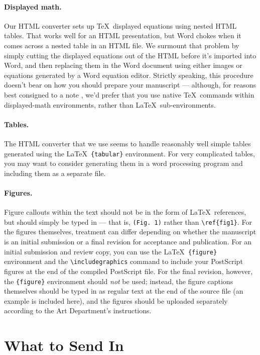\documentclass[12pt]{article}
\begin{document}
\paragraph*{Displayed math.} Our HTML converter sets up \TeX\
displayed equations using nested HTML tables.  That works well for an
HTML presentation, but Word chokes when it comes across a nested
table in an HTML file.  We surmount that problem by simply cutting the
displayed equations out of the HTML before it's imported into Word,
and then replacing them in the Word document using either images or
equations generated by a Word equation editor.  Strictly speaking,
this procedure doesn't bear on how you should prepare your manuscript
--- although, for reasons best consigned to a note \cite{nattex}, we'd
prefer that you use native \TeX\ commands within displayed-math
environments, rather than \LaTeX\ sub-environments.

\paragraph*{Tables.}  The HTML converter that we use seems to handle
reasonably well simple tables generated using the \LaTeX\
\texttt{\{tabular\}} environment.  For very complicated tables, you
may want to consider generating them in a word processing program and
including them as a separate file.

\paragraph*{Figures.}  Figure callouts within the text should not be
in the form of \LaTeX\ references, but should simply be typed in ---
that is, \verb+(Fig. 1)+ rather than \verb+\ref{fig1}+.  For the
figures themselves, treatment can differ depending on whether the
manuscript is an initial submission or a final revision for acceptance
and publication.  For an initial submission and review copy, you can
use the \LaTeX\ \verb+{figure}+ environment and the
\verb+\includegraphics+ command to include your PostScript figures at
the end of the compiled PostScript file.  For the final revision,
however, the \verb+{figure}+ environment should {\it not\/} be used;
instead, the figure captions themselves should be typed in as regular
text at the end of the source file (an example is included here), and
the figures should be uploaded separately according to the Art
Department's instructions.


\section*{What to Send In}
\end{document}
